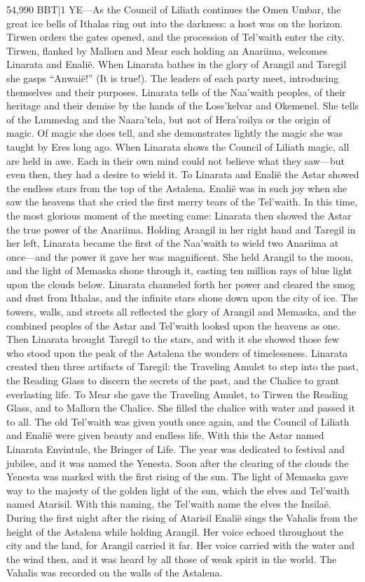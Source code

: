 \documentclass[smalldemyvopaper,11pt,twoside,onecolumn,openright,extrafontsizes]{memoir}
\begin{document}
54,990 BBT|1 YE—As the Council of Liliath continues the Omen Umbar, the great ice bells of Ithalas ring out into the darkness: a host was on the horizon. Tirwen orders the gates opened, and the procession of Tel’waith enter the city. Tirwen, flanked by Mallorn and Mear each holding an Anariima, welcomes Linarata and Enalië. When Linarata bathes in the glory of Arangil and Taregil she gasps “Anwaië!” (It is true!). The leaders of each party meet, introducing themselves and their purposes. Linarata tells of the Naa’waith peoples, of their heritage and their demise by the hands of the Loss’kelvar and Okemenel. She tells of the Luumedag and the Naara’tela, but not of Hera’roilya or the origin of magic. Of magic she does tell, and she demonstrates lightly the magic she was taught by Eres long ago. When Linarata shows the Council of Liliath magic, all are held in awe. Each in their own mind could not believe what they saw—but even then, they had a desire to wield it. To Linarata and Enalië the Astar showed the endless stars from the top of the Astalena. Enalië was in such joy when she saw the heavens that she cried the first merry tears of the Tel’waith. 
In this time, the most glorious moment of the meeting came: Linarata then showed the Astar the true power of the Anariima. Holding Arangil in her right hand and Taregil in her left, Linarata became the first of the Naa’waith to wield two Anariima at once—and the power it gave her was magnificent. She held Arangil to the moon, and the light of Memaska shone through it, casting ten million rays of blue light upon the clouds below. Linarata channeled forth her power and cleared the smog and dust from Ithalas, and the infinite stars shone down upon the city of ice. The towers, walls, and streets all reflected the glory of Arangil and Memaska, and the combined peoples of the Astar and Tel’waith looked upon the heavens as one. Then Linarata brought Taregil to the stars, and with it she showed those few who stood upon the peak of the Astalena the wonders of timelessness. Linarata created then three artifacts of Taregil: the Traveling Amulet to step into the past, the Reading Glass to discern the secrets of the past, and the Chalice to grant everlasting life. To Mear she gave the Traveling Amulet, to Tirwen the Reading Glass, and to Mallorn the Chalice. She filled the chalice with water and passed it to all. The old Tel’waith was given youth once again, and the Council of Liliath and Enalië were given beauty and endless life. With this the Astar named Linarata Envintule, the Bringer of Life.
	The year was dedicated to festival and jubilee, and it was named the Yenesta. Soon after the clearing of the clouds the Yenesta was marked with the first rising of the sun. The light of Memaska gave way to the majesty of the golden light of the sun, which the elves and Tel’waith named Atarisil. With this naming, the Tel’waith name the elves the Insilaë. During the first night after the rising of Atarisil Enalië sings the Vahalis from the height of the Astalena while holding Arangil. Her voice echoed throughout the city and the land, for Arangil carried it far. Her voice carried with the water and the wind then, and it was heard by all those of weak spirit in the world. The Vahalis was recorded on the walls of the Astalena.
\end{document}
